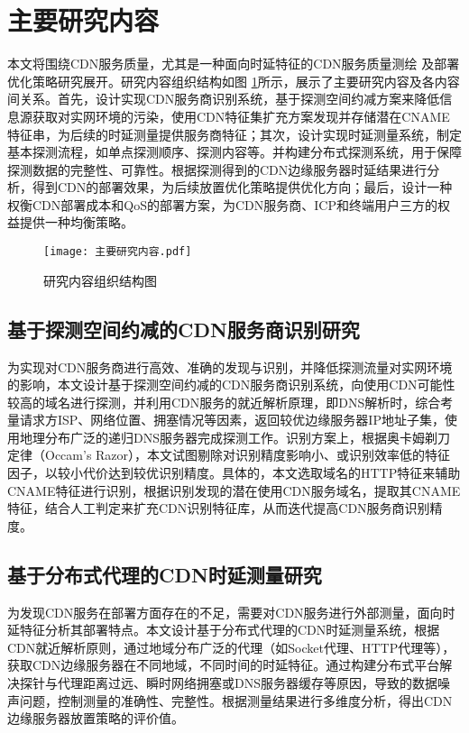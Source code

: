 
\section{主要研究内容}
本文将围绕CDN服务质量，尤其是一种面向时延特征的CDN服务质量测绘
及部署优化策略研究展开。研究内容组织结构如图 \ref{fig:研究内容组织结构图}所示，展示了主要研究内容及各内容间关系。首先，设计实现CDN服务商识别系统，基于探测空间约减方案来降低信息源获取对实网环境的污染，使用CDN特征集扩充方案发现并存储潜在CNAME特征串，为后续的时延测量提供服务商特征；其次，设计实现时延测量系统，制定基本探测流程，如单点探测顺序、探测内容等。并构建分布式探测系统，用于保障探测数据的完整性、可靠性。根据探测得到的CDN边缘服务器时延结果进行分析，得到CDN的部署效果，为后续放置优化策略提供优化方向；最后，设计一种权衡CDN部署成本和QoS的部署方案，为CDN服务商、ICP和终端用户三方的权益提供一种均衡策略。

\begin{figure}[ht]
  \centering
  \texttt{[image: 主要研究内容.pdf]}
 
  \caption{研究内容组织结构图}
  \label{fig:研究内容组织结构图}
\end{figure}



\subsection{基于探测空间约减的CDN服务商识别研究}

为实现对CDN服务商进行高效、准确的发现与识别，并降低探测流量对实网环境的影响，本文设计基于探测空间约减的CDN服务商识别系统，向使用CDN可能性较高的域名进行探测，并利用CDN服务的就近解析原理，即DNS解析时，综合考量请求方ISP、网络位置、拥塞情况等因素，返回较优边缘服务器IP地址子集，使用地理分布广泛的递归DNS服务器完成探测工作。识别方案上，根据奥卡姆剃刀定律（Occam's Razor），本文试图剔除对识别精度影响小、或识别效率低的特征因子，以较小代价达到较优识别精度。具体的，本文选取域名的HTTP特征来辅助CNAME特征进行识别，根据识别发现的潜在使用CDN服务域名，提取其CNAME特征，结合人工判定来扩充CDN识别特征库，从而迭代提高CDN服务商识别精度。


\subsection{基于分布式代理的CDN时延测量研究}

为发现CDN服务在部署方面存在的不足，需要对CDN服务进行外部测量，面向时延特征分析其部署特点。本文设计基于分布式代理的CDN时延测量系统，根据CDN就近解析原则，通过地域分布广泛的代理（如Socket代理、HTTP代理等），获取CDN边缘服务器在不同地域，不同时间的时延特征。通过构建分布式平台解决探针与代理距离过远、瞬时网络拥塞或DNS服务器缓存等原因，导致的数据噪声问题，控制测量的准确性、完整性。根据测量结果进行多维度分析，得出CDN边缘服务器放置策略的评价值。


